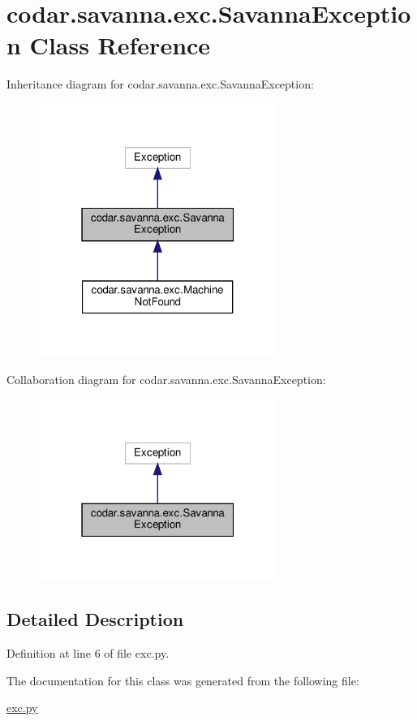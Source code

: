 \hypertarget{classcodar_1_1savanna_1_1exc_1_1_savanna_exception}{}\section{codar.\+savanna.\+exc.\+Savanna\+Exception Class Reference}
\label{classcodar_1_1savanna_1_1exc_1_1_savanna_exception}


Inheritance diagram for codar.\+savanna.\+exc.\+Savanna\+Exception\+:
\nopagebreak
\begin{figure}[H]
\begin{center}
\leavevmode
\includegraphics[width=220pt]{classcodar_1_1savanna_1_1exc_1_1_savanna_exception__inherit__graph}
\end{center}
\end{figure}


Collaboration diagram for codar.\+savanna.\+exc.\+Savanna\+Exception\+:
\nopagebreak
\begin{figure}[H]
\begin{center}
\leavevmode
\includegraphics[width=220pt]{classcodar_1_1savanna_1_1exc_1_1_savanna_exception__coll__graph}
\end{center}
\end{figure}


\subsection{Detailed Description}


Definition at line 6 of file exc.\+py.



The documentation for this class was generated from the following file\+:\begin{DoxyCompactItemize}
\item 
\hyperlink{exc_8py}{exc.\+py}\end{DoxyCompactItemize}
